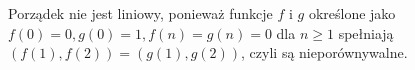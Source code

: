 \documentclass{../note}
\begin{document}
\begin{rozwiazanie}
Porządek nie jest liniowy, ponieważ funkcje $f$ i $g$ określone jako $f(0) = 0, g(0) = 1, f(n) = g(n) = 0$ dla $n \geq 1$ spełniają $(f(1), f(2)) = (g(1), g(2))$, czyli są nieporównywalne.
\end{rozwiazanie}
\end{document}
